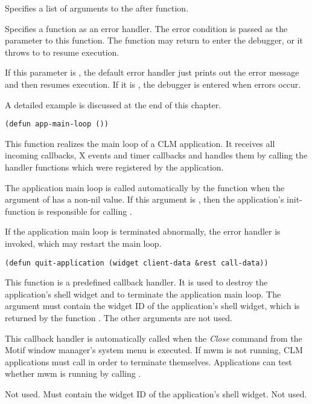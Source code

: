 \begin{lispd}
\begin{paramd}
 Specifies a list of arguments to the after function.

 Specifies a function as an error handler. The error
condition is passed as the parameter to this function. The function may
return to enter the debugger, or it throws to 
to resume execution.

 If this parameter is , the default
error handler just prints out the error message and then resumes execution.
If it is , the debugger is entered when errors occur.
\end{paramd}
\beispiel\normalsize A detailed example is discussed at the end of this chapter.
\end{lispd}

\begin{lispd}
\syntax\begin{verbatim}
(defun app-main-loop ())
\end{verbatim}
\beschr This function realizes the main loop of a CLM application.  It receives
all incoming callbacks, X events and timer callbacks and handles them by calling
the handler functions which were registered by the application.

The application main loop is called automatically by the function
 when the  argument of
 has a non-nil value.  If this argument is
, then the application's init-function is responsible for calling
. 

If the application main loop is terminated abnormally, the error handler
is invoked, which may restart the main loop.
\end{lispd}

\begin{lispd}
\syntax\begin{verbatim}
(defun quit-application (widget client-data &rest call-data))
\end{verbatim}
\beschr This function is a predefined callback handler. It is used to
destroy the application's shell widget and to terminate the
application main loop. The  argument must contain
the widget ID of the application's shell widget, which is returned by
the function . The other arguments are not used.

\hinweis This callback handler is automatically called when the {\it Close}
command from the Motif window manager's system menu is executed.  If mwm is not
running, CLM applications must call  in order to
terminate themselves. Applications can test whether mwm is running by calling 
. 

\begin{paramd}
 Not used.
 Must contain the widget ID of the application's shell
widget.
 Not used.
\end{paramd}
\end{lispd}

